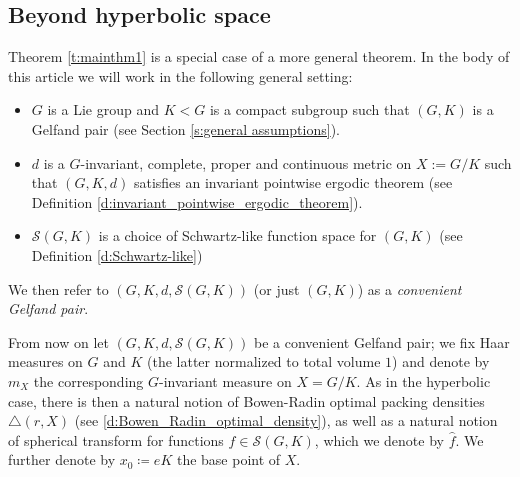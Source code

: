 \documentclass[12pt,reqno,a4paper]{amsart}
\theoremstyle{theorem}
\theoremstyle{definition}
\numberwithin{theorem}{section}
\numberwithin{equation}{section}
\begin{document}
\subsection{Beyond hyperbolic space}

Theorem \ref{t:mainthm1} is a special case of a more general theorem. In the body of this article we will work in the following general setting:
\begin{itemize}
	\item $G$ is a Lie group and $K<G$ is a compact subgroup such that $(G,K)$ is a Gelfand pair (see Section \ref{s:general assumptions}).
	\item $d$ is a $G$-invariant, complete, proper and continuous metric on $X := G/K$ such that $(G,K,d)$ satisfies an invariant pointwise ergodic theorem (see Definition \ref{d:invariant_pointwise_ergodic_theorem}).
	\item $\mathcal{S}(G,K)$ is a choice of Schwartz-like function space for $(G,K)$ (see Definition \ref{d:Schwartz-like})
\end{itemize}
We then refer to $(G,K, d, \mathcal{S}(G, K))$ (or just $(G,K)$) as a \emph{convenient Gelfand pair}. 

From now on let $(G,K, d, \mathcal{S}(G, K))$ be a convenient Gelfand pair; we fix  Haar measures on $G$ and $K$ (the latter normalized to total volume $1$) and denote by $m_X$ the corresponding $G$-invariant measure on $X = G/K$. As in the hyperbolic case, there is then a natural notion of Bowen-Radin optimal packing densities $\triangle(r, X)$ (see \ref{d:Bowen_Radin_optimal_density}), as well as a natural notion of spherical transform for functions $f\in \mathcal{S}(G, K)$, which we denote by $\widehat{f}$. We further denote by $x_0\coloneqq eK$ the base point of $X$.
\end{document}

